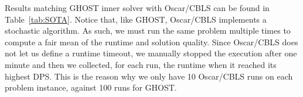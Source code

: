 \documentclass[journal]{IEEEtran}
\newcommand{\ghost}{\textsc{GHOST}\xspace}
\begin{document}


Results matching \ghost  inner solver with Oscar/CBLS can  be found in
Table~\ref{tab:SOTA}. Notice that, like \ghost, Oscar/CBLS implements a stochastic
algorithm.  As such, we  must run the same problem multiple times to compute a 
fair mean of the runtime and solution quality.
Since Oscar/CBLS does not let us define a runtime timeout, we manually stopped
the execution after one minute and then we collected, for each run, the runtime 
when it reached its highest DPS.
This is the reason why we only have 10 Oscar/CBLS runs on each
problem instance, against 100 runs for \ghost.

\end{document}
